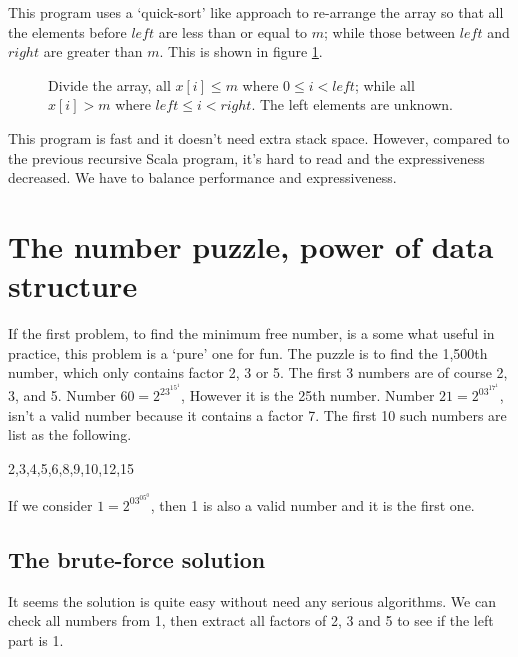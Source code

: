 \documentclass{article}
\begin{document}
This program uses a `quick-sort' like approach to re-arrange the
array so that all the elements before $left$ are less than or equal
to $m$; while those between $left$ and $right$ are greater
than $m$. This is shown in figure \ref{fig:divide}.

\begin{figure}[htbp]
  \centering
  \caption{Divide the array, all $x[i] \leq m$ where $0 \leq i < left$; while all $x[i] > m$ where $left \leq i < right$. The left elements are unknown.} \label{fig:divide}
\end{figure}

This program is fast and it doesn't need extra stack space. However,
compared to the previous recursive Scala program, it's hard to read and the
expressiveness decreased. We have to balance performance
and expressiveness.

\section{The number puzzle, power of data structure}

If the first problem, to find the minimum free number, is a some what
useful in practice, this problem is a `pure' one for fun. The puzzle
is to find the 1,500th number, which only contains factor 2, 3 or 5.
The first 3 numbers are of course 2, 3, and 5. Number $60 = 2^23^15^1$,
However it is the 25th number. Number $21 = 2^03^17^1$, isn't a valid
number because it contains a factor 7. The first 10 such numbers are list
as the following.

2,3,4,5,6,8,9,10,12,15

If we consider $1=2^03^05^0$, then 1 is also a valid number and it is
the first one.

\subsection{The brute-force solution}
It seems the solution is quite easy without need any serious algorithms.
We can check all numbers from 1, then extract all factors of 2, 3 and 5
to see if the left part is 1.
\end{document}
